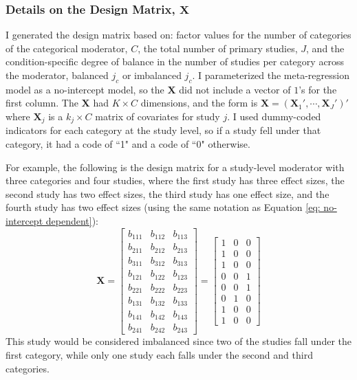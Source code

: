 
\subsubsection{Details on the Design Matrix, $\bm{X}$}
I generated the design matrix based on: factor values for the number of categories of the categorical moderator, $C$, the total number of primary studies, $J$, and the condition-specific degree of balance in the number of studies per category across the moderator, balanced $j_c$ or imbalanced $j_c$. I parameterized the meta-regression model as a no-intercept model, so the $\bm{X}$ did not include a vector of $1$'s for the first column. The $\bm{X}$ had $K \times C$ dimensions, and the form is $\bm{X} = (\bm{X}_1', \cdots, \bm{X}_J')'$ where $\bm{X}_j$ is a $k_j \times C$ matrix of covariates for study $j$. I used dummy-coded indicators for each category at the study level, so if a study fell under that category, it had a code of ``1" and a code of ``0" otherwise. 

For example, the following is the design matrix for a study-level moderator with three categories and four studies, where the first study has three effect sizes, the second study has two effect sizes, the third study has one effect size, and the fourth study has two effect sizes (using the same notation as Equation \ref{eq: no-intercept dependent}): 
\begin{equation}
  \mathbf{X} =\begin{bmatrix}
    b_{111} & b_{112} & b_{113} \\
    b_{211} & b_{212} & b_{213} \\
    b_{311} & b_{312} & b_{313} \\
    b_{121} & b_{122} & b_{123} \\
    b_{221} & b_{222} & b_{223} \\
    b_{131} & b_{132} & b_{133} \\
    b_{141} & b_{142} & b_{143} \\
    b_{241} & b_{242} & b_{243} 
   \end{bmatrix} = 
   \begin{bmatrix}
    1 & 0  & 0 \\
    1 & 0  & 0 \\
    1 & 0  & 0 \\
    0 & 0  & 1 \\
    0 & 0  & 1 \\
    0 & 1  & 0 \\
    1 & 0  & 0 \\
    1 & 0  & 0 
   \end{bmatrix} 
   \nonumber
\end{equation}
This study would be considered imbalanced since two of the studies fall under the first category, while only one study each falls under the second and third categories. 

